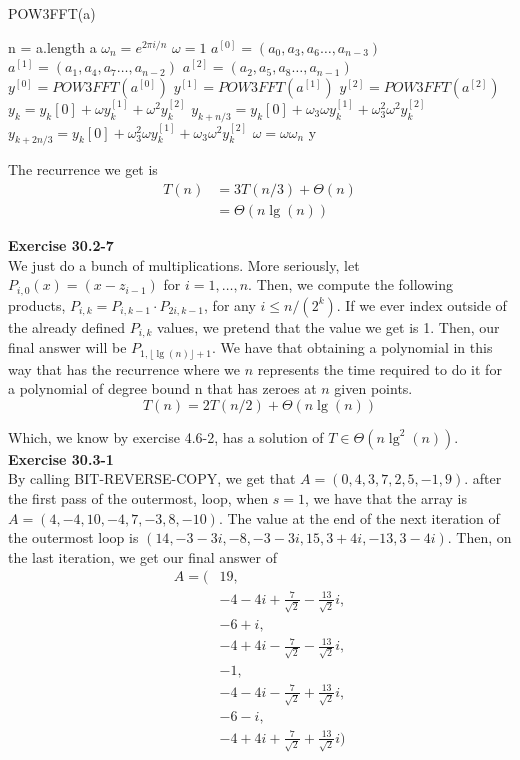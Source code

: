 \documentclass{article}
\begin{document}
\begin{algorithm}
\caption{POW3FFT(a)}
\begin{algorithmic}
\State n = a.length
\State \Return a
\EndIf
\State $\omega_n = e^{2\pi i/n}$
\State $\omega =1$
\State $a^{[0]} = (a_0,a_3,a_6\ldots, a_{n-3})$
\State $a^{[1]} = (a_1,a_4,a_7\ldots, a_{n-2})$
\State $a^{[2]} = (a_2,a_5,a_8\ldots, a_{n-1})$
\State $y^{[0]} = POW3FFT(a^{[0]})$
\State $y^{[1]} = POW3FFT(a^{[1]})$
\State $y^{[2]} = POW3FFT(a^{[2]})$
\State $y_k = y_k[0] +\omega y_k^{[1]} + \omega^2 y_{k}^{[2]}$
\State $y_{k+n/3} = y_k[0] +\omega_3\omega y_k^{[1]} + \omega_3^2\omega^2 y_{k}^{[2]}$
\State $y_{k+2n/3} = y_k[0] +\omega_3^2\omega y_k^{[1]} + \omega_3\omega^2 y_{k}^{[2]}$
\State $\omega = \omega \omega_n$
\EndFor
\State\Return y
\end{algorithmic}
\end{algorithm}

The recurrence we get is
\begin{align*}
T(n) &= 3 T(n/3) + \Theta(n)\\
&= \Theta(n\lg(n))
\end{align*}

\noindent\textbf{Exercise 30.2-7}\\
We just do a bunch of multiplications. More seriously, let $P_{i,0}(x) = (x-z_{i-1})$ for $i=1,\ldots,n$. Then, we compute the following products, $P_{i,k} = P_{i,k-1} \cdot P_{2i,k-1}$, for any $i\le n/(2^k)$. If we ever index outside of the already defined $P_{i,k}$ values, we pretend that the value we get is 1. Then, our final answer will be $P_{1,\lfloor\lg(n)\rfloor+1}$. We have that obtaining a polynomial in this way that has the recurrence where we $n$ represents the time required to do it for a polynomial of degree bound n that has zeroes at $n$ given points.
\[
T(n) = 2T(n/2) + \Theta(n\lg(n))
\]

Which, we know by exercise 4.6-2, has a solution of $T\in \Theta(n\lg^2(n))$.\\


\noindent\textbf{Exercise 30.3-1}\\
By calling BIT-REVERSE-COPY, we get that $A = (0,4,3,7,2,5,-1,9)$. after the first pass of the outermost, loop, when $s=1$, we have that the array is $A= (4,-4,10,-4,7,-3,8,-10)$. The value at the end of the next iteration of the outermost loop is $(14,-3-3i,-8,-3-3i,15,3+4i,-13,3-4i)$. Then, on the last iteration, we get our final answer of 
\begin{align*}
A = (&19,\\
&-4-4i+\frac{7}{\sqrt{2}} -\frac{13}{\sqrt{2}}i,\\
&-6+i,\\
&-4+4i-\frac{7}{\sqrt{2}} -\frac{13}{\sqrt{2}}i,\\
&-1,\\
&-4-4i-\frac{7}{\sqrt{2}} +\frac{13}{\sqrt{2}}i,\\
&-6-i,\\
&-4+4i+\frac{7}{\sqrt{2}} +\frac{13}{\sqrt{2}}i)
\end{align*}\\
\end{document}

